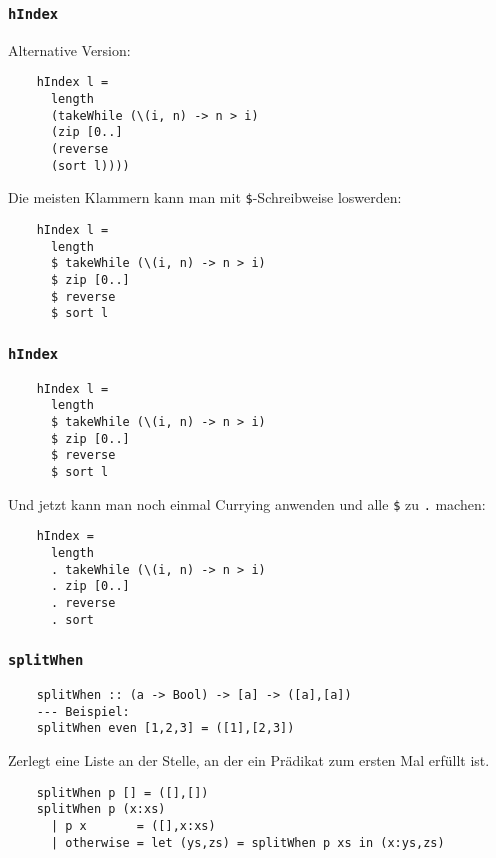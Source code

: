 \documentclass{beamer}
\begin{document}
\begin{frame}[fragile]
  \frametitle{\lstinline{hIndex}}
  Alternative Version:
  \begin{lstlisting}
    hIndex l =
      length
      (takeWhile (\(i, n) -> n > i)
      (zip [0..]
      (reverse
      (sort l))))
  \end{lstlisting}
  \pause
  Die meisten Klammern kann man mit \lstinline{$}-Schreibweise loswerden:
  \begin{lstlisting}
    hIndex l =
      length
      $ takeWhile (\(i, n) -> n > i)
      $ zip [0..]
      $ reverse
      $ sort l
  \end{lstlisting}
\end{frame}

\begin{frame}[fragile]
  \frametitle{\lstinline{hIndex}}
  \begin{lstlisting}
    hIndex l =
      length
      $ takeWhile (\(i, n) -> n > i)
      $ zip [0..]
      $ reverse
      $ sort l
  \end{lstlisting}
  \pause
  Und jetzt kann man noch einmal Currying anwenden und alle \lstinline{$} zu \lstinline{.} machen:
  \begin{lstlisting}
    hIndex =
      length
      . takeWhile (\(i, n) -> n > i)
      . zip [0..]
      . reverse
      . sort
  \end{lstlisting}
\end{frame}

\begin{frame}[fragile]
  \frametitle{\lstinline{splitWhen}}
  \begin{lstlisting}
    splitWhen :: (a -> Bool) -> [a] -> ([a],[a])
    --- Beispiel:
    splitWhen even [1,2,3] = ([1],[2,3])
  \end{lstlisting}
  Zerlegt eine Liste an der Stelle, an der ein Prädikat zum ersten Mal erfüllt ist.
  \pause
  \begin{lstlisting}
    splitWhen p [] = ([],[])
    splitWhen p (x:xs)
      | p x       = ([],x:xs)
      | otherwise = let (ys,zs) = splitWhen p xs in (x:ys,zs)
  \end{lstlisting}
\end{frame}
\end{document}
